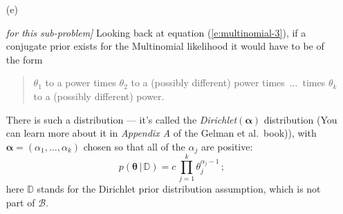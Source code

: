 \documentclass[12pt]{article}
\newcommand{\given}{\, | \,}
\newenvironment{solution}{\begin{tcolorbox}[breakable]\begin{proof}[\textbf{\textit{Solution}}] }{\end{proof}\end{tcolorbox}}
\begin{document}
\begin{itemize}
\begin{itemize}
\begin{itemize}

\item[(ii)]

Finally, use Your estimated SE for $\hat{ \gamma }$ to construct an approximate (large-sample) 99.9\% LCB for $\gamma$ \textit{[5 points]}. Was Biden ahead of Trump at the point when the survey was conducted by an amount that was large in \textit{practical} terms? Was Biden's lead at that point \textit{statistically} significant at the 99.9\% level? Explain briefly. \textit{\fbox{\textbf{[5 points]}}}

\begin{solution}
    We know $\hat{\gamma_{MLE}} = (\hat{\theta_1}-\hat{\theta_2}) = 0.0830$ and we worked out our standard error of it to be $0.0274$. So using R and plugging in what we have into the given equation we get our $99.9\%$ LCB for $\gamma$ to be,
    \[0.0830 - (3.08)\cdot (0.0274) = -0.0018\]
    Meaning this lead that Biden had over Trump is not quite statistically significant (since it has a negative lower bound), but it was in practical terms, since $\gamma$ worked out to be around 8 percentage points and that much of a lead in a presidential debate is significant. The lead did become statistically significant though at the $99.8\%$ confidence interval level.  
\end{solution}

\end{itemize}

\item[(e)]

\textit{\fbox{\textbf{[10 total points}} for this sub-problem]} \vspace*{0.025in} Looking back at equation (\ref{e:multinomial-3}), if a conjugate prior exists for the Multinomial likelihood it would have to be of the form

\begin{quote}

$\theta_1$ to a power times $\theta_2$ to a (possibly different) power times~...~times $\theta_k$ to a (possibly different) power.

\end{quote}

There is such a distribution --- it's called the \textit{Dirichlet}$( \bm{ \alpha } )$ distribution (You can learn more about it in \textit{Appendix A} of the Gelman et al.~book)), with $\bm{ \alpha } = ( \alpha_1, \dots, \alpha_k )$ chosen so that all of the $\alpha_j$ are positive:
\begin{equation} \label{e:multinomial-12}
p ( \bm{ \theta } \given \mathbb{ D } ) = c \, \prod_{ j = 1 }^k \theta_j^{ \alpha_j - 1 } \, ;
\end{equation}
here $\mathbb{ D }$ stands for the Dirichlet prior distribution assumption, which is not part of $\mathcal{ B }$. 


\end{itemize}
\end{itemize}
\end{document}
